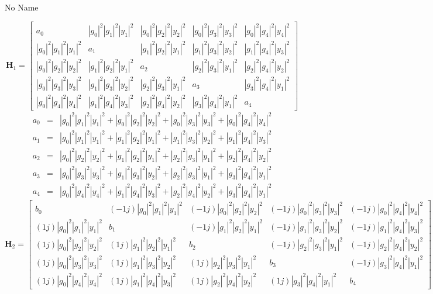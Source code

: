 \documentclass[a4paper,10pt]{article}
\begin{document}
\begin{section}{No Name}
\begin{landscape}
\begin{equation}
\boldsymbol{H}_1 = 
\begin{bmatrix}
a_{0}&|g_0|^2|g_1|^2|y_1|^2&|g_0|^2|g_2|^2|y_2|^2&|g_0|^2|g_3|^2|y_3|^2&|g_0|^2|g_4|^2|y_4|^2\\
|g_0|^2|g_1|^2|y_1|^2&a_{1}&|g_1|^2|g_2|^2|y_1|^2&|g_1|^2|g_3|^2|y_2|^2&|g_1|^2|g_4|^2|y_3|^2\\
|g_0|^2|g_2|^2|y_2|^2&|g_1|^2|g_2|^2|y_1|^2&a_{2}&|g_2|^2|g_3|^2|y_1|^2&|g_2|^2|g_4|^2|y_2|^2\\
|g_0|^2|g_3|^2|y_3|^2&|g_1|^2|g_3|^2|y_2|^2&|g_2|^2|g_3|^2|y_1|^2&a_{3}&|g_3|^2|g_4|^2|y_1|^2\\
|g_0|^2|g_4|^2|y_4|^2&|g_1|^2|g_4|^2|y_3|^2&|g_2|^2|g_4|^2|y_2|^2&|g_3|^2|g_4|^2|y_1|^2&a_{4}
\end{bmatrix}
\end{equation}
\begin{eqnarray}
a_{0} &=& |g_0|^2|g_1|^2|y_1|^2 + |g_0|^2|g_2|^2|y_2|^2 + |g_0|^2|g_3|^2|y_3|^2 + |g_0|^2|g_4|^2|y_4|^2\\
a_{1} &=& |g_0|^2|g_1|^2|y_1|^2 + |g_1|^2|g_2|^2|y_1|^2 + |g_1|^2|g_3|^2|y_2|^2 + |g_1|^2|g_4|^2|y_3|^2\\
a_{2} &=& |g_0|^2|g_2|^2|y_2|^2 + |g_1|^2|g_2|^2|y_1|^2 + |g_2|^2|g_3|^2|y_1|^2 + |g_2|^2|g_4|^2|y_2|^2\\
a_{3} &=& |g_0|^2|g_3|^2|y_3|^2 + |g_1|^2|g_3|^2|y_2|^2 + |g_2|^2|g_3|^2|y_1|^2 + |g_3|^2|g_4|^2|y_1|^2\\
a_{4} &=& |g_0|^2|g_4|^2|y_4|^2 + |g_1|^2|g_4|^2|y_3|^2 + |g_2|^2|g_4|^2|y_2|^2 + |g_3|^2|g_4|^2|y_1|^2
\end{eqnarray}
\begin{equation}
\boldsymbol{H}_2 = 
\begin{bmatrix}
b_{0}&(-1j)|g_0|^2|g_1|^2|y_1|^2&(-1j)|g_0|^2|g_2|^2|y_2|^2&(-1j)|g_0|^2|g_3|^2|y_3|^2&(-1j)|g_0|^2|g_4|^2|y_4|^2\\
(1j)|g_0|^2|g_1|^2|y_1|^2&b_{1}&(-1j)|g_1|^2|g_2|^2|y_1|^2&(-1j)|g_1|^2|g_3|^2|y_2|^2&(-1j)|g_1|^2|g_4|^2|y_3|^2\\
(1j)|g_0|^2|g_2|^2|y_2|^2&(1j)|g_1|^2|g_2|^2|y_1|^2&b_{2}&(-1j)|g_2|^2|g_3|^2|y_1|^2&(-1j)|g_2|^2|g_4|^2|y_2|^2\\
(1j)|g_0|^2|g_3|^2|y_3|^2&(1j)|g_1|^2|g_3|^2|y_2|^2&(1j)|g_2|^2|g_3|^2|y_1|^2&b_{3}&(-1j)|g_3|^2|g_4|^2|y_1|^2\\
(1j)|g_0|^2|g_4|^2|y_4|^2&(1j)|g_1|^2|g_4|^2|y_3|^2&(1j)|g_2|^2|g_4|^2|y_2|^2&(1j)|g_3|^2|g_4|^2|y_1|^2&b_{4}
\end{bmatrix}

\end{equation}
\end{landscape}
\end{section}
\end{document}

